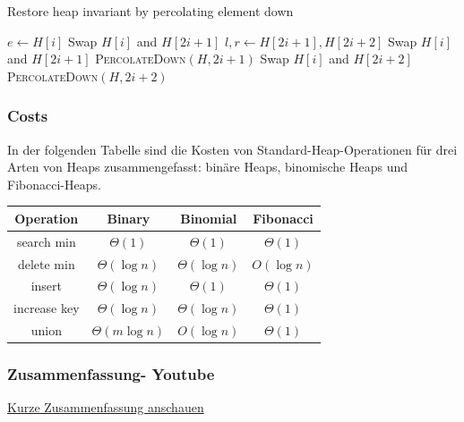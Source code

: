 \documentclass[a4paper]{article}
\begin{document}
\begin{algorithm}
\caption{Restore heap invariant by percolating element down}
\begin{algorithmic}[1]
   
  \State $e \gets H\left[i\right]$
  \State Swap $H\left[i\right]$ and $H\left[2i+1\right]$
  \EndIf
  \State $l, r \gets H\left[2i+1\right], H\left[2i+2\right]$
  \State Swap $H\left[i\right]$ and $H\left[2i+1\right]$
  \State \textsc{PercolateDown}$\left(H, 2i+1\right)$
  \EndIf
  \Else
  \State Swap $H\left[i\right]$ and $H\left[2i+2\right]$
  \State \textsc{PercolateDown}$\left(H, 2i+2\right)$
  \EndIf
  \EndIf
  \EndIf  
  \EndFunction
\end{algorithmic}
\end{algorithm}

\subsubsection*{Costs}

In der folgenden Tabelle sind die Kosten von Standard-Heap-Operationen für drei Arten von Heaps zusammengefasst: binäre Heaps, binomische Heaps und Fibonacci-Heaps. \\

\begin{tabular}{|c|c|c|c|}
  \hline
  \label{Tab: KostenHeaps}
\textbf{Operation}    & \textbf{Binary}             & \textbf{Binomial}         & \textbf{Fibonacci}   \\
\hline
search min   & $\Theta(1)$        & $\Theta(1)$      & $\Theta(1)$ \\
delete min   & $\Theta(\log n)$   & $\Theta(\log n)$ & $O(\log n)$ \\
insert       & $\Theta(\log n)$   & $\Theta(1)$      & $\Theta(1)$ \\
increase key & $\Theta(\log n)$   & $\Theta(\log n)$ & $\Theta(1)$ \\
  union        & $\Theta(m \log n)$ & $O(\log n)$      & $\Theta(1)$  \\
                                                         \hline
\end{tabular}


\subsubsection*{Zusammenfassung- Youtube}
\href{https://www.youtube.com/watch?v=0wPlzMU-k00}{Kurze Zusammenfassung anschauen}
\end{document}
